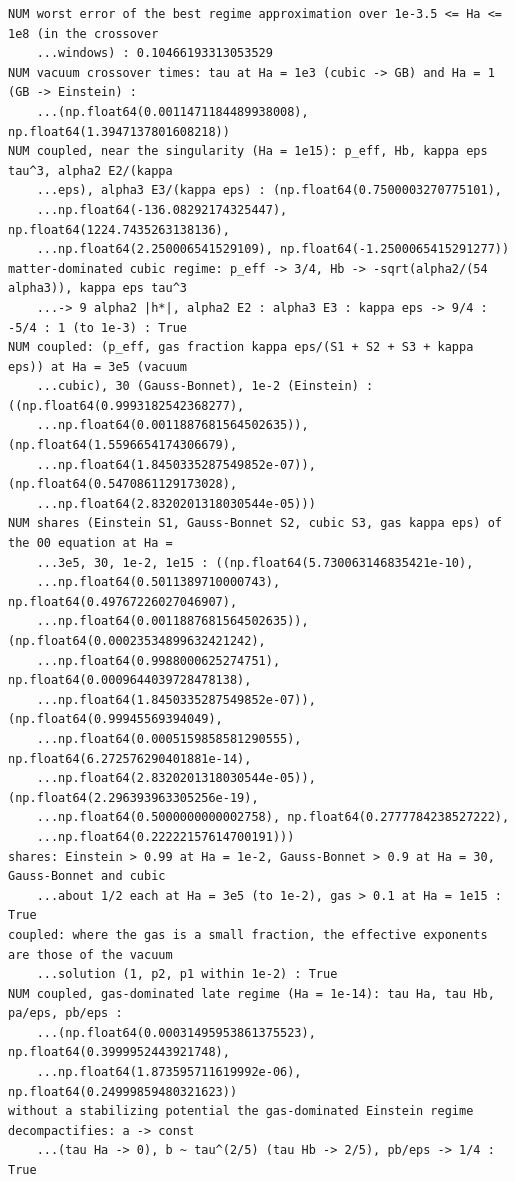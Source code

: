 \documentclass[10pt,a4paper]{article}
\begin{document}
\begin{Verbatim}[fontsize=\small,frame=single,framesep=2mm]
NUM worst error of the best regime approximation over 1e-3.5 <= Ha <= 1e8 (in the crossover
    ...windows) : 0.10466193313053529
NUM vacuum crossover times: tau at Ha = 1e3 (cubic -> GB) and Ha = 1 (GB -> Einstein) :
    ...(np.float64(0.0011471184489938008), np.float64(1.3947137801608218))
NUM coupled, near the singularity (Ha = 1e15): p_eff, Hb, kappa eps tau^3, alpha2 E2/(kappa
    ...eps), alpha3 E3/(kappa eps) : (np.float64(0.7500003270775101),
    ...np.float64(-136.08292174325447), np.float64(1224.7435263138136),
    ...np.float64(2.250006541529109), np.float64(-1.2500065415291277))
matter-dominated cubic regime: p_eff -> 3/4, Hb -> -sqrt(alpha2/(54 alpha3)), kappa eps tau^3
    ...-> 9 alpha2 |h*|, alpha2 E2 : alpha3 E3 : kappa eps -> 9/4 : -5/4 : 1 (to 1e-3) : True
NUM coupled: (p_eff, gas fraction kappa eps/(S1 + S2 + S3 + kappa eps)) at Ha = 3e5 (vacuum
    ...cubic), 30 (Gauss-Bonnet), 1e-2 (Einstein) : ((np.float64(0.9993182542368277),
    ...np.float64(0.0011887681564502635)), (np.float64(1.5596654174306679),
    ...np.float64(1.8450335287549852e-07)), (np.float64(0.5470861129173028),
    ...np.float64(2.8320201318030544e-05)))
NUM shares (Einstein S1, Gauss-Bonnet S2, cubic S3, gas kappa eps) of the 00 equation at Ha =
    ...3e5, 30, 1e-2, 1e15 : ((np.float64(5.730063146835421e-10),
    ...np.float64(0.5011389710000743), np.float64(0.49767226027046907),
    ...np.float64(0.0011887681564502635)), (np.float64(0.00023534899632421242),
    ...np.float64(0.9988000625274751), np.float64(0.0009644039728478138),
    ...np.float64(1.8450335287549852e-07)), (np.float64(0.99945569394049),
    ...np.float64(0.0005159858581290555), np.float64(6.272576290401881e-14),
    ...np.float64(2.8320201318030544e-05)), (np.float64(2.296393963305256e-19),
    ...np.float64(0.5000000000002758), np.float64(0.2777784238527222),
    ...np.float64(0.22222157614700191)))
shares: Einstein > 0.99 at Ha = 1e-2, Gauss-Bonnet > 0.9 at Ha = 30, Gauss-Bonnet and cubic
    ...about 1/2 each at Ha = 3e5 (to 1e-2), gas > 0.1 at Ha = 1e15 : True
coupled: where the gas is a small fraction, the effective exponents are those of the vacuum
    ...solution (1, p2, p1 within 1e-2) : True
NUM coupled, gas-dominated late regime (Ha = 1e-14): tau Ha, tau Hb, pa/eps, pb/eps :
    ...(np.float64(0.00031495953861375523), np.float64(0.3999952443921748),
    ...np.float64(1.873595711619992e-06), np.float64(0.24999859480321623))
without a stabilizing potential the gas-dominated Einstein regime decompactifies: a -> const
    ...(tau Ha -> 0), b ~ tau^(2/5) (tau Hb -> 2/5), pb/eps -> 1/4 : True

\end{Verbatim}
\end{document}

